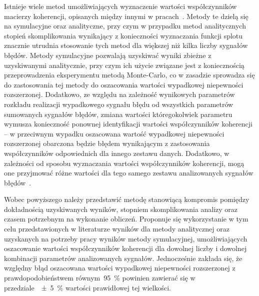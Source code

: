Istnieje wiele metod umożliwiających wyznaczenie wartości współczynników macierzy koherencji, opisanych między innymi w pracach~\cite{jakubiec_redmono, jakubiec_reductive, jakubiec_system, batko_uncertainty}. Metody te dzielą się na symulacyjne oraz analityczne, przy czym w przypadku metod analitycznych stopień skomplikowania wynikający z konieczności wyznaczania funkcji splotu znacznie utrudnia stosowanie tych metod dla większej niż kilka liczby sygnałów błędów. Metody symulacyjne pozwalają uzyskiwać wyniki zbieżne z uzyskiwanymi analitycznie, przy czym ich użycie związane jest z koniecznością przeprowadzenia eksperymentu metodą Monte-Carlo, co w zasadzie sprowadza się do zastosowania tej metody do oszacowania wartości wypadkowej niepewności rozszerzonej. Dodatkowo, ze względu na zależność wynikowych parametrów rozkładu realizacji wypadkowego sygnału błędu od wszystkich parametrów sumowanych sygnałów błędów, zmiana wartości któregokolwiek parametru wymusza konieczność ponownej identyfikacji wartości współczynników koherencji -- w przeciwnym wypadku oszacowana wartość wypadkowej niepewności rozszerzonej obarczona będzie błędem wynikającym z zastosowania współczynników odpowiednich dla innego zestawu danych. Dodatkowo, w zależności od sposobu wyznaczania wartości współczynników koherencji, mogą one przyjmować różne wartości dla tego samego zestawu analizowanych sygnałów błędów~\cite{jakubiec_redmono}.

Wobec powyższego należy przedstawić metodę stanowiącą kompromis pomiędzy dokładnością uzyskiwanych wyników, stopniem skomplikowania analizy oraz czasem potrzebnym na wykonanie obliczeń. Proponuje się wykorzystanie w tym celu przedstawionych w literaturze wyników dla metody analitycznej oraz uzyskanych na potrzeby pracy wyników metody symulacyjnej, umożliwiających oszacowanie wartości współczynników koherencji dla dowolnej liczby i dowolnej kombinacji parametrów analizowanych sygnałów. Jednocześnie zakłada się, że względny błąd oszacowana wartości wypadkowej niepewności rozszerzonej z prawdopodobieństwem równym~\qty{95}{\percent} powinien zawierać się w przedziale~\qty{\pm 5}{\percent} wartości prawidłowej tej wielkości.

